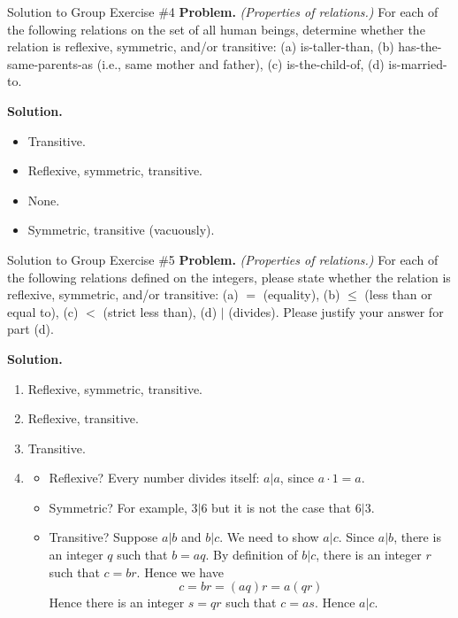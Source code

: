 \documentclass[10pt]{beamer}
\begin{document}
\begin{frame}{Solution to Group Exercise \#4}
\textbf{Problem.} \textit{(Properties of relations.)} 
For each of the following relations on the set of all human beings, determine whether the relation is reflexive, symmetric, and/or transitive: (a) is-taller-than, (b) has-the-same-parents-as (i.e., same mother and father), (c)  is-the-child-of, (d) is-married-to.
	
\vfill 
\textbf{Solution.} 

\begin{itemize}
\item[a.] Transitive.
\item[b.] Reflexive, symmetric, transitive.
\item[c.] None.
\item[d.] Symmetric, transitive (vacuously).
\end{itemize}

\end{frame}



\begin{frame}{Solution to Group Exercise \#5}
\small 
\textbf{Problem.} \textit{(Properties of relations.)} 
For each of the following relations defined on the integers, please state whether the relation is reflexive, symmetric, and/or transitive: (a) $=$ (equality), (b) $\leq$ (less than or equal to), (c) $<$ (strict less than), (d) $|$ (divides). Please justify your answer for part (d).
	
\vfill 
\textbf{Solution.} 
\begin{enumerate}
	\item Reflexive, symmetric, transitive.
	\item Reflexive, transitive.
	\item Transitive.
	\item  
	\begin{itemize}
	\item Reflexive? \greencheck Every number divides itself: $a|a$, since $a \cdot 1 = a$.
	\item Symmetric?  \redx  For example, $3|6$ but it is not the case that $6|3$.
	\item Transitive?  \greencheck    Suppose $a|b$ and $b|c$.  We need to show $a|c$.  Since $a|b$, there is an integer $q$ such that $b=aq$.  By definition of $b|c$, there is an integer $r$ such that $c=br$.  Hence we have 
	\[ c=br = (aq)r = a(qr)\]
	Hence there is an integer $s=qr$ such that $c=as$.  Hence $a|c$.  	
	\end{itemize}
\end{enumerate}
\end{frame}
\end{document}
